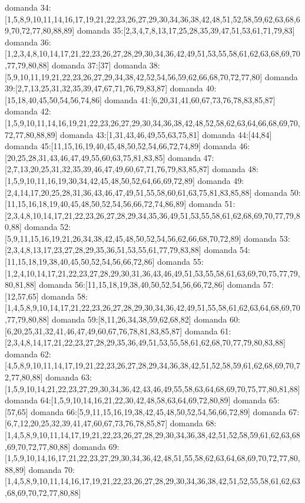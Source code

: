 domanda 34:[1,5,8,9,10,11,14,16,17,19,21,22,23,26,27,29,30,34,36,38,42,48,51,52,58,59,62,63,68,69,70,72,77,80,88,89]
domanda 35:[2,3,4,7,8,13,17,25,28,35,39,47,51,53,61,71,79,83]
domanda 36:[1,2,3,4,8,10,14,17,21,22,23,26,27,28,29,30,34,36,42,49,51,53,55,58,61,62,63,68,69,70,77,79,80,88]
domanda 37:[37]
domanda 38:[5,9,10,11,19,21,22,23,26,27,29,34,38,42,52,54,56,59,62,66,68,70,72,77,80]
domanda 39:[2,7,13,25,31,32,35,39,47,67,71,76,79,83,87]
domanda 40:[15,18,40,45,50,54,56,74,86]
domanda 41:[6,20,31,41,60,67,73,76,78,83,85,87]
domanda 42:[1,5,9,10,11,14,16,19,21,22,23,26,27,29,30,34,36,38,42,48,52,58,62,63,64,66,68,69,70,72,77,80,88,89]
domanda 43:[1,31,43,46,49,55,63,75,81]
domanda 44:[44,84]
domanda 45:[11,15,16,19,40,45,48,50,52,54,66,72,74,89]
domanda 46:[20,25,28,31,43,46,47,49,55,60,63,75,81,83,85]
domanda 47:[2,7,13,20,25,31,32,35,39,46,47,49,60,67,71,76,79,83,85,87]
domanda 48:[1,5,9,10,11,16,19,30,34,42,45,48,50,52,64,66,69,72,89]
domanda 49:[2,4,14,17,20,25,28,31,36,43,46,47,49,51,55,58,60,61,63,75,81,83,85,88]
domanda 50:[11,15,16,18,19,40,45,48,50,52,54,56,66,72,74,86,89]
domanda 51:[2,3,4,8,10,14,17,21,22,23,26,27,28,29,34,35,36,49,51,53,55,58,61,62,68,69,70,77,79,80,88]
domanda 52:[5,9,11,15,16,19,21,26,34,38,42,45,48,50,52,54,56,62,66,68,70,72,89]
domanda 53:[2,3,4,8,13,17,23,27,28,29,35,36,51,53,55,61,77,79,83,88]
domanda 54:[11,15,18,19,38,40,45,50,52,54,56,66,72,86]
domanda 55:[1,2,4,10,14,17,21,22,23,27,28,29,30,31,36,43,46,49,51,53,55,58,61,63,69,70,75,77,79,80,81,88]
domanda 56:[11,15,18,19,38,40,50,52,54,56,66,72,86]
domanda 57:[12,57,65]
domanda 58:[1,4,5,8,9,10,14,17,21,22,23,26,27,28,29,30,34,36,42,49,51,55,58,61,62,63,64,68,69,70,77,79,80,88]
domanda 59:[8,11,26,34,38,59,62,68,82]
domanda 60:[6,20,25,31,32,41,46,47,49,60,67,76,78,81,83,85,87]
domanda 61:[2,3,4,8,14,17,21,22,23,27,28,29,35,36,49,51,53,55,58,61,62,68,70,77,79,80,83,88]
domanda 62:[4,5,8,9,10,11,14,17,19,21,22,23,26,27,28,29,34,36,38,42,51,52,58,59,61,62,68,69,70,72,77,80,88]
domanda 63:[1,5,9,10,14,21,22,23,27,29,30,34,36,42,43,46,49,55,58,63,64,68,69,70,75,77,80,81,88]
domanda 64:[1,5,9,10,14,16,21,22,30,42,48,58,63,64,69,72,80,89]
domanda 65:[57,65]
domanda 66:[5,9,11,15,16,19,38,42,45,48,50,52,54,56,66,72,89]
domanda 67:[6,7,12,20,25,32,39,41,47,60,67,73,76,78,85,87]
domanda 68:[1,4,5,8,9,10,11,14,17,19,21,22,23,26,27,28,29,30,34,36,38,42,51,52,58,59,61,62,63,68,69,70,72,77,80,88]
domanda 69:[1,5,9,10,14,16,17,21,22,23,27,29,30,34,36,42,48,51,55,58,62,63,64,68,69,70,72,77,80,88,89]
domanda 70:[1,4,5,8,9,10,11,14,16,17,19,21,22,23,26,27,28,29,30,34,36,38,42,51,52,55,58,61,62,63,68,69,70,72,77,80,88]
